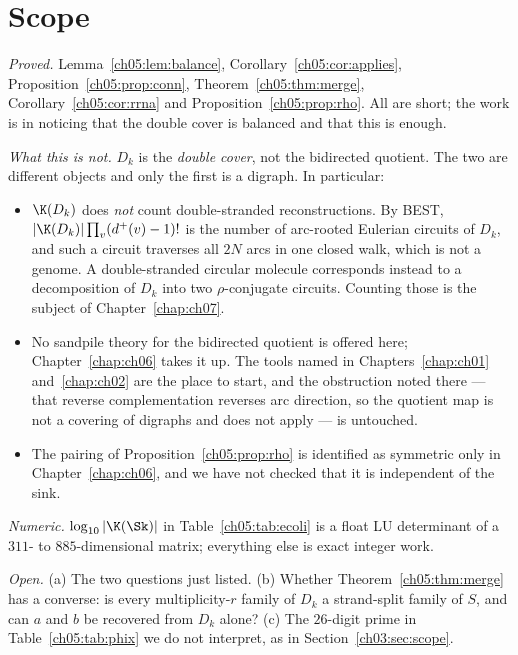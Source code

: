 \section{Scope}\label{ch05:sec:scope}

\emph{Proved.} Lemma~\ref{ch05:lem:balance}, Corollary~\ref{ch05:cor:applies},
Proposition~\ref{ch05:prop:conn}, Theorem~\ref{ch05:thm:merge}, Corollary~\ref{ch05:cor:rrna} and
Proposition~\ref{ch05:prop:rho}. All are short; the work is in noticing that the double cover
is balanced and that this is enough.

\emph{What this is not.} $D_k$ is the \emph{double cover}, not the bidirected quotient.
The two are different objects and only the first is a digraph. In particular:
\begin{itemize}
\item $\K(D_k)$ does \emph{not} count double-stranded reconstructions. By BEST,
$|\K(D_k)|\prod_v(d^{+}(v)-1)!$ is the number of arc-rooted Eulerian circuits of $D_k$,
and such a circuit traverses all $2N$ arcs in one closed walk, which is not a genome. A
double-stranded circular molecule corresponds instead to a decomposition of $D_k$ into two
$\rho$-conjugate circuits. Counting those is the subject of Chapter~\ref{chap:ch07}.
\item No sandpile theory for the bidirected quotient is offered here; Chapter~\ref{chap:ch06} takes it
up. The tools \cite{Zas82} named in Chapters~\ref{chap:ch01} and~\ref{chap:ch02} are the place to start, and the obstruction
noted there --- that reverse complementation reverses arc direction, so the quotient map
is not a covering of digraphs and \cite{RT14} does not apply --- is untouched.
\item The pairing of Proposition~\ref{ch05:prop:rho} is identified as symmetric only in
Chapter~\ref{chap:ch06}, and we have not checked that it is independent of the sink.
\end{itemize}

\emph{Numeric.} $\log_{10}|\K(\Sk)|$ in Table~\ref{ch05:tab:ecoli} is a float LU determinant of
a $311$- to $885$-dimensional matrix; everything else is exact integer work.

\emph{Open.} (a) The two questions just listed. (b) Whether
Theorem~\ref{ch05:thm:merge} has a converse: is every multiplicity-$r$ family of $D_k$ a
strand-split family of $S$, and can $a$ and $b$ be recovered from $D_k$ alone?
(c) The $26$-digit prime in Table~\ref{ch05:tab:phix} we do not interpret, as in
Section~\ref{ch03:sec:scope}.

